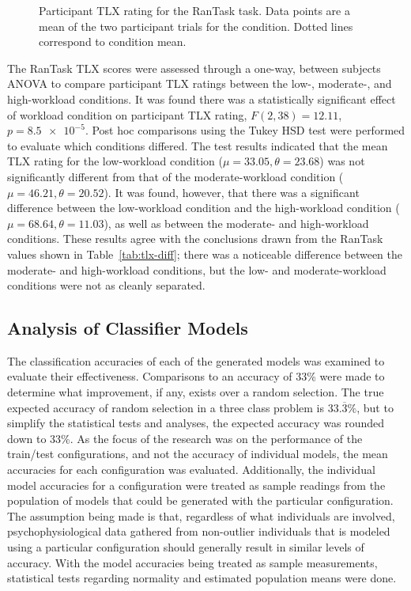 \documentclass[11pt]{article}
\begin{document}
		\begin{figure}
		\centering
		\caption[Participant TLX Rating for RanTask Task]{Participant TLX rating for the RanTask task. Data points are a mean of the two participant trials for the condition. Dotted lines correspond to condition mean.}
		\label{fig:rantask-tlx}
		\end{figure} 
		
		The RanTask TLX scores were assessed through a one-way, between subjects ANOVA to compare participant TLX ratings between the low-, moderate-, and high-workload conditions. It was found there was a statistically significant effect of workload condition on participant TLX rating, \(F(2,38) = 12.11\), \(p = \num{8.5e-5}\). Post hoc comparisons using the Tukey HSD test were performed to evaluate which conditions differed. The test results indicated that the mean TLX rating for the low-workload condition (\(\mu = 33.05, \theta = 23.68 \)) was not significantly different from that of the moderate-workload condition (\(\mu = 46.21, \theta = 20.52\)). It was found, however, that there was a significant difference between the low-workload condition and the high-workload condition (\(\mu = 68.64, \theta = 11.03\)), as well as between the moderate- and high-workload conditions. These results agree with the conclusions drawn from the RanTask values shown in Table~\ref{tab:tlx-diff}; there was a noticeable difference between the moderate- and high-workload conditions, but the low- and moderate-workload conditions were not as cleanly separated.
		
	\subsection{Analysis of Classifier Models}
	The classification accuracies of each of the generated models was examined to evaluate their effectiveness. Comparisons to an accuracy of 33\% were made to determine what improvement, if any, exists over a random selection. The true expected accuracy of random selection in a three class problem is \(33.\overline{3}\%\), but to simplify the statistical tests and analyses, the expected accuracy was rounded down to 33\%. As the focus of the research was on the performance of the train/test configurations, and not the accuracy of individual models, the mean accuracies for each configuration was evaluated. Additionally, the individual model accuracies for a configuration were treated as sample readings from the population of models that could be generated with the particular configuration. The assumption being made is that, regardless of what individuals are involved, psychophysiological data gathered from non-outlier individuals that is modeled using a particular configuration should generally result in similar levels of accuracy. With the model accuracies being treated as sample measurements, statistical tests regarding normality and estimated population means were done.
	
\end{document}
